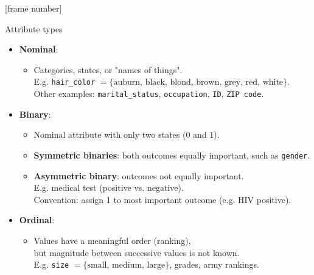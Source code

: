 \documentclass[aspectratio=169,t]{beamer}
\begin{document}
  {
    [frame number]
    \begin{frame}{Attribute types}
    \begin{itemize}
        \item \textbf{Nominal}:
        \begin{itemize}
            \item Categories, states, or "names of things".\\
                  E.g. \texttt{hair\_color} $= \{\text{auburn, black, blond, brown, grey, red, white}\}$.\\
                  Other examples: \texttt{marital\_status}, \texttt{occupation}, \texttt{ID}, \texttt{ZIP code}.
        \end{itemize}
        \item \textbf{Binary}:
            \begin{itemize}
                \item Nominal attribute with only two states ($0$ and $1$).
                \item \textbf{Symmetric binaries}: both outcomes equally important, such as \texttt{gender}.
                \item \textbf{Asymmetric binary}: outcomes not equally important. \\
                      E.g. medical test (positive vs. negative).\\
                      Convention: assign 1 to most important outcome (e.g. HIV positive).
            \end{itemize}
        \item \textbf{Ordinal}:
        \begin{itemize}
            \item Values have a meaningful order (ranking),\\
            but magnitude between successive values is not known.\\
            E.g. \texttt{size} $= \{\text{small, medium, large}\}$, grades, army rankings.
        \end{itemize}
        \end{itemize}
    \end{frame}
  }
\end{document}
